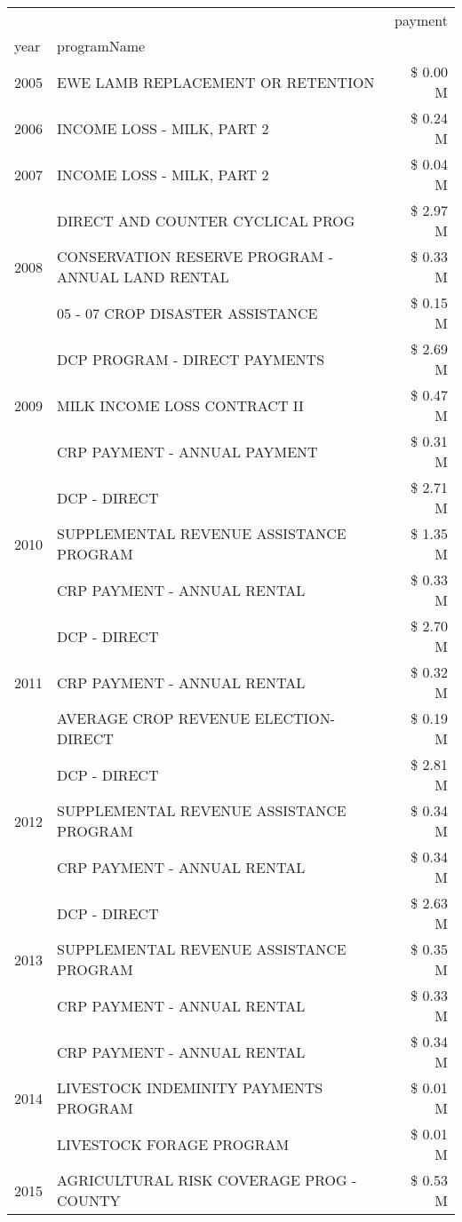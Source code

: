 \begin{tabular}{llr}
\toprule
 &  & payment \\
year & programName &  \\
\midrule
2005 & EWE LAMB REPLACEMENT OR RETENTION & \$ 0.00 M \\
\cline{1-3}
2006 & INCOME LOSS - MILK, PART 2 & \$ 0.24 M \\
\cline{1-3}
2007 & INCOME LOSS - MILK, PART 2 & \$ 0.04 M \\
\cline{1-3}
\multirow[t]{3}{*}{2008} & DIRECT AND COUNTER CYCLICAL PROG & \$ 2.97 M \\
 & CONSERVATION RESERVE PROGRAM - ANNUAL LAND RENTAL & \$ 0.33 M \\
 & 05 - 07 CROP DISASTER ASSISTANCE & \$ 0.15 M \\
\cline{1-3}
\multirow[t]{3}{*}{2009} & DCP PROGRAM - DIRECT PAYMENTS & \$ 2.69 M \\
 & MILK INCOME LOSS CONTRACT II & \$ 0.47 M \\
 & CRP PAYMENT - ANNUAL PAYMENT & \$ 0.31 M \\
\cline{1-3}
\multirow[t]{3}{*}{2010} & DCP - DIRECT & \$ 2.71 M \\
 & SUPPLEMENTAL REVENUE ASSISTANCE PROGRAM & \$ 1.35 M \\
 & CRP PAYMENT - ANNUAL RENTAL & \$ 0.33 M \\
\cline{1-3}
\multirow[t]{3}{*}{2011} & DCP - DIRECT & \$ 2.70 M \\
 & CRP PAYMENT - ANNUAL RENTAL & \$ 0.32 M \\
 & AVERAGE CROP REVENUE ELECTION-DIRECT & \$ 0.19 M \\
\cline{1-3}
\multirow[t]{3}{*}{2012} & DCP - DIRECT & \$ 2.81 M \\
 & SUPPLEMENTAL REVENUE ASSISTANCE PROGRAM & \$ 0.34 M \\
 & CRP PAYMENT - ANNUAL RENTAL & \$ 0.34 M \\
\cline{1-3}
\multirow[t]{3}{*}{2013} & DCP - DIRECT & \$ 2.63 M \\
 & SUPPLEMENTAL REVENUE ASSISTANCE PROGRAM & \$ 0.35 M \\
 & CRP PAYMENT - ANNUAL RENTAL & \$ 0.33 M \\
\cline{1-3}
\multirow[t]{3}{*}{2014} & CRP PAYMENT - ANNUAL RENTAL & \$ 0.34 M \\
 & LIVESTOCK INDEMINITY PAYMENTS PROGRAM & \$ 0.01 M \\
 & LIVESTOCK FORAGE PROGRAM & \$ 0.01 M \\
\cline{1-3}
\multirow[t]{3}{*}{2015} & AGRICULTURAL RISK COVERAGE PROG - COUNTY & \$ 0.53 M \\

\end{tabular}
